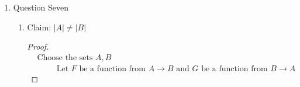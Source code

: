 \documentclass{article}
\begin{document}
\begin{enumerate}
\begin{enumerate}
\begin{proof}
\begin{align}
                &\hspace{1cm} \text{As long as $n > 9$, concatenate $\texttt{"9"}$ to the end of $s$ and decrease $n$ by 9}  \\
                &\hspace{1cm} n \text{ is concatenated to the end of } s \\
                &\text{For every } x \in \mathbb{N} \text{, there is some string containing digits that add up to } x
            \end{align}
        \end{proof}
    \end{enumerate}
    \item Question Seven
    \begin{enumerate}
        \item Claim: $|A| \neq |B|$
        \begin{proof}
            \begin{align}
                &\text{Choose the sets } A,B \\
                &\hspace{1cm} \text{Let $F$ be a function from $A \rightarrow B$ and $G$ be a function from $B \rightarrow A$}
            \end{align}
        \end{proof}
    \end{enumerate}
\end{enumerate}
\end{document}
